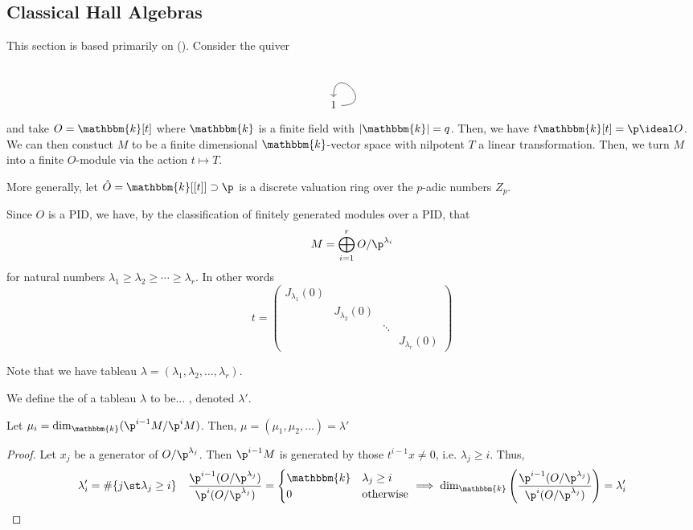 \documentclass[11pt,leqno,oneside]{amsbook}
\numberwithin{thm}{section}
\newcommand{\bbk}{\mathbbm{k}} %
\begin{document}
\subsection{Classical Hall Algebras}
This section is based primarily on (\cite{macdonald}). Consider the quiver \[
  \begin{tikzcd}
    1 \arrow[out=0,in=90,loop]
  \end{tikzcd}
\]
and take \(O = \bbk[t]\) where \(\bbk\) is a finite field with
\(|\bbk|=q\). Then, we have \(t\bbk[t] = \p \ideal O\). We can then
constuct \(M\) to be a finite dimensional \(\bbk\)-vector space with
nilpotent \(T\) a linear transformation. Then, we turn \(M\) into a finite
\(O\)-module via the action \(t \mapsto T\).
\begin{rmk}
  More generally, let \(\hat{O} = \bbk[[t]] \supset \p\) is a discrete
  valuation ring over the \(p\)-adic numbers \(Z_p\).
\end{rmk}
\begin{thm}
  Since \(O\) is a PID, we have, by the classification of finitely
  generated modules over a PID, that \[
    M = \bigoplus_{i=1}^r O/\p^{\lambda_i}
  \]
  for natural numbers \(\lambda_1 \geq \lambda_2 \geq \cdots \geq
  \lambda_r\). In other words \[
    t = \left(
      \begin{array}{cccc}
J_{\lambda_1}(0) & & & \\
& J_{\lambda_2}(0)  & & \\
& & \ddots & \\
& & & J_{\lambda_r}(0)        
      \end{array}
\right)
  \]
\end{thm}
Note that we have tableau \(\lambda = (\lambda_1, \lambda_2, \ldots,
\lambda_r)\).
\begin{defn}
  We define the  of a tableau \(\lambda\) to
  be... , denoted \(\lambda'\).
\end{defn}
\begin{prop}
  Let \(\mu_i = \dim_\bbk(\p^{i-1}M / \p^i M)\). Then, \(\mu = (\mu_1,
  \mu_2, \ldots) = \lambda'\)
\end{prop}
\begin{proof}
  Let \(x_j\) be a generator of \(O/\p^{\lambda_j}\). Then \(\p^{i-1}
  M \) is generated by those \(t^{i-1} x \neq 0\), i.e. \(\lambda_j
  \geq i\). Thus, \[
    \lambda_i' = \#\{j \st \lambda_j \geq i\} \ \ \
    \frac{\p^{i-1}(O/\p^{\lambda_j})}{\p^i(O/\p^{\lambda_j})} =
    \begin{cases}
      \bbk & \lambda_j \geq i\\
      0 & \text{otherwise}
    \end{cases}
    \implies
    \dim_\bbk\left(\frac{\p^{i-1}(O/\p^{\lambda_j})}{\p^i(O/\p^{\lambda_j})}\right)
    = \lambda_i'
  \]
\end{proof}
\end{document}
